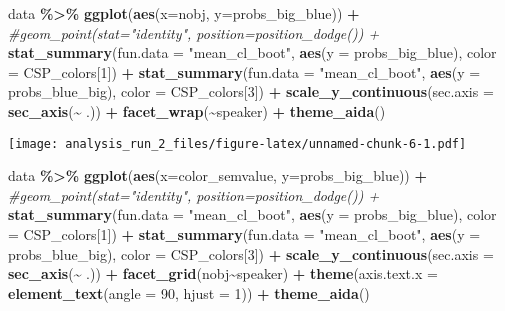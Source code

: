 \documentclass[
]{article}
\newenvironment{Shaded}{\begin{snugshade}}{\end{snugshade}}
\newcommand{\AttributeTok}[1]{\textcolor[rgb]{0.13,0.29,0.53}{#1}}
\newcommand{\CommentTok}[1]{\textcolor[rgb]{0.56,0.35,0.01}{\textit{#1}}}
\newcommand{\DecValTok}[1]{\textcolor[rgb]{0.00,0.00,0.81}{#1}}
\newcommand{\FunctionTok}[1]{\textcolor[rgb]{0.13,0.29,0.53}{\textbf{#1}}}
\newcommand{\NormalTok}[1]{#1}
\newcommand{\SpecialCharTok}[1]{\textcolor[rgb]{0.81,0.36,0.00}{\textbf{#1}}}
\newcommand{\StringTok}[1]{\textcolor[rgb]{0.31,0.60,0.02}{#1}}
\begin{document}
\begin{Shaded}
\begin{Highlighting}[]
\NormalTok{data }\SpecialCharTok{\%\textgreater{}\%} 
  \FunctionTok{ggplot}\NormalTok{(}\FunctionTok{aes}\NormalTok{(}\AttributeTok{x=}\NormalTok{nobj, }\AttributeTok{y=}\NormalTok{probs\_big\_blue)) }\SpecialCharTok{+} 
  \CommentTok{\#geom\_point(stat="identity", position=position\_dodge()) + }
  \FunctionTok{stat\_summary}\NormalTok{(}\AttributeTok{fun.data =} \StringTok{"mean\_cl\_boot"}\NormalTok{, }\FunctionTok{aes}\NormalTok{(}\AttributeTok{y =}\NormalTok{ probs\_big\_blue), }\AttributeTok{color =}\NormalTok{ CSP\_colors[}\DecValTok{1}\NormalTok{]) }\SpecialCharTok{+}
  \FunctionTok{stat\_summary}\NormalTok{(}\AttributeTok{fun.data =} \StringTok{"mean\_cl\_boot"}\NormalTok{, }\FunctionTok{aes}\NormalTok{(}\AttributeTok{y =}\NormalTok{ probs\_blue\_big), }\AttributeTok{color =}\NormalTok{ CSP\_colors[}\DecValTok{3}\NormalTok{]) }\SpecialCharTok{+}
  \FunctionTok{scale\_y\_continuous}\NormalTok{(}\AttributeTok{sec.axis =} \FunctionTok{sec\_axis}\NormalTok{(}\SpecialCharTok{\textasciitilde{}}\NormalTok{ .)) }\SpecialCharTok{+}
  \FunctionTok{facet\_wrap}\NormalTok{(}\SpecialCharTok{\textasciitilde{}}\NormalTok{speaker) }\SpecialCharTok{+}
  \FunctionTok{theme\_aida}\NormalTok{()}
\end{Highlighting}
\end{Shaded}

\texttt{[image: analysis\_run\_2\_files/figure-latex/unnamed-chunk-6-1.pdf]}

\begin{Shaded}
\begin{Highlighting}[]
\NormalTok{data }\SpecialCharTok{\%\textgreater{}\%} 
  \FunctionTok{ggplot}\NormalTok{(}\FunctionTok{aes}\NormalTok{(}\AttributeTok{x=}\NormalTok{color\_semvalue, }\AttributeTok{y=}\NormalTok{probs\_big\_blue)) }\SpecialCharTok{+} 
  \CommentTok{\#geom\_point(stat="identity", position=position\_dodge()) + }
  \FunctionTok{stat\_summary}\NormalTok{(}\AttributeTok{fun.data =} \StringTok{"mean\_cl\_boot"}\NormalTok{, }\FunctionTok{aes}\NormalTok{(}\AttributeTok{y =}\NormalTok{ probs\_big\_blue), }\AttributeTok{color =}\NormalTok{ CSP\_colors[}\DecValTok{1}\NormalTok{]) }\SpecialCharTok{+}
  \FunctionTok{stat\_summary}\NormalTok{(}\AttributeTok{fun.data =} \StringTok{"mean\_cl\_boot"}\NormalTok{, }\FunctionTok{aes}\NormalTok{(}\AttributeTok{y =}\NormalTok{ probs\_blue\_big), }\AttributeTok{color =}\NormalTok{ CSP\_colors[}\DecValTok{3}\NormalTok{]) }\SpecialCharTok{+}
  \FunctionTok{scale\_y\_continuous}\NormalTok{(}\AttributeTok{sec.axis =} \FunctionTok{sec\_axis}\NormalTok{(}\SpecialCharTok{\textasciitilde{}}\NormalTok{ .)) }\SpecialCharTok{+}
  \FunctionTok{facet\_grid}\NormalTok{(nobj}\SpecialCharTok{\textasciitilde{}}\NormalTok{speaker) }\SpecialCharTok{+}
  \FunctionTok{theme}\NormalTok{(}\AttributeTok{axis.text.x =} \FunctionTok{element\_text}\NormalTok{(}\AttributeTok{angle =} \DecValTok{90}\NormalTok{, }\AttributeTok{hjust =} \DecValTok{1}\NormalTok{)) }\SpecialCharTok{+}
  \FunctionTok{theme\_aida}\NormalTok{()}
\end{Highlighting}
\end{Shaded}
\end{document}
